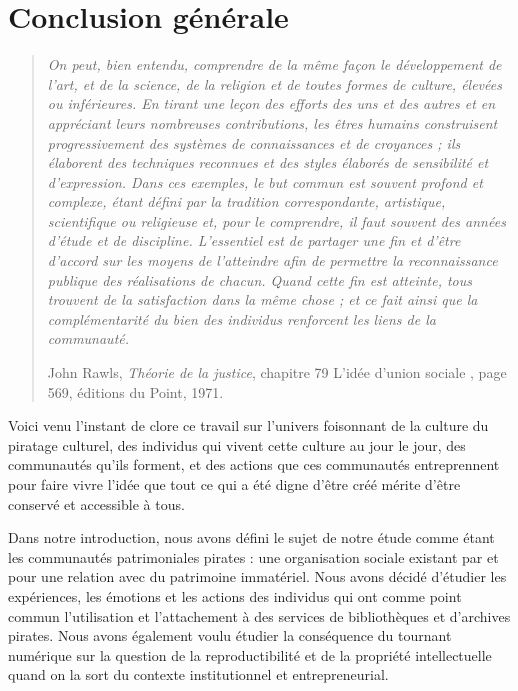 \chapter{Conclusion générale}

\begin{quote}
    \textit{On peut, bien entendu, comprendre de la même façon le développement de l'art, et de la science, de la religion et de toutes formes de culture, élevées ou inférieures. En tirant une leçon des efforts des uns et des autres et en appréciant leurs nombreuses contributions, les êtres humains construisent progressivement des systèmes de connaissances et de croyances ; ils élaborent des techniques reconnues et des styles élaborés de sensibilité et d'expression. Dans ces exemples, le but commun est souvent profond et complexe, étant défini par la tradition correspondante, artistique, scientifique ou religieuse et, pour le comprendre, il faut souvent des années d'étude et de discipline. L'essentiel est de partager  une fin et d'être d'accord sur les moyens de l'atteindre afin de permettre la reconnaissance publique des réalisations de chacun. Quand cette fin est atteinte, tous trouvent de la satisfaction dans la même chose ; et ce fait ainsi que la complémentarité du bien des individus renforcent les liens de la communauté.}

    John Rawls, \textit{Théorie de la justice}, chapitre 79 \og L'idée d'union sociale \fg, page 569, éditions du Point, 1971.
    
\end{quote}

Voici venu l'instant de clore ce travail sur l'univers foisonnant de la culture du piratage culturel, des individus qui vivent cette culture au jour le jour, des communautés qu'ils forment, et des actions que ces communautés entreprennent pour faire vivre l'idée que tout ce qui a été digne d'être créé mérite d'être conservé et accessible à tous. 

Dans notre introduction, nous avons défini le sujet de notre étude comme étant les communautés patrimoniales pirates : une organisation sociale existant par et pour une relation avec du patrimoine immatériel. Nous avons décidé d'étudier les expériences, les émotions et les actions des individus qui ont comme point commun l'utilisation et l'attachement à des services de bibliothèques et d'archives pirates. Nous avons également voulu étudier la conséquence du tournant numérique sur la question de la reproductibilité et de la propriété intellectuelle quand on la sort du contexte institutionnel et entrepreneurial. 

